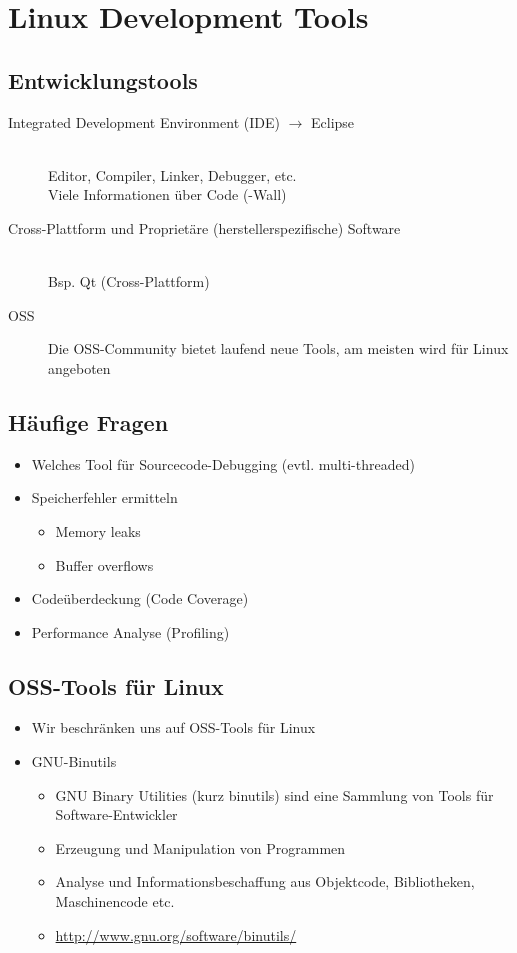 \section{Linux Development Tools}
\subsection{Entwicklungstools}
\begin{description}
    \item [Integrated Development Environment (IDE) $\rightarrow$ Eclipse] \hfill \\
    Editor, Compiler, Linker, Debugger, etc. \\
    Viele Informationen über Code (-Wall)
    \item [Cross-Plattform und Proprietäre (herstellerspezifische) Software] \hfill \\
    Bsp. Qt (Cross-Plattform)
    \item [OSS]$~$\\
    Die OSS-Community bietet laufend neue Tools, am meisten wird für Linux angeboten
\end{description}

\subsection{Häufige Fragen}
\begin{itemize}
  \item Welches Tool für Sourcecode-Debugging (evtl. multi-threaded)
  \item Speicherfehler ermitteln
  \begin{itemize}
    \item Memory leaks
    \item Buffer overflows
  \end{itemize}
  \item Codeüberdeckung (Code Coverage)
  \item Performance Analyse (Profiling)
\end{itemize}

\subsection{OSS-Tools für Linux}
\begin{itemize}
  \item Wir beschränken uns auf OSS-Tools für Linux
  \item GNU-Binutils
  \begin{itemize}
    \item GNU Binary Utilities (kurz binutils) sind eine Sammlung von Tools für Software-Entwickler
    \item Erzeugung und Manipulation von Programmen
    \item Analyse und Informationsbeschaffung aus Objektcode, Bibliotheken, Maschinencode etc.
    \item \url{http://www.gnu.org/software/binutils/}
  \end{itemize}
\end{itemize}

